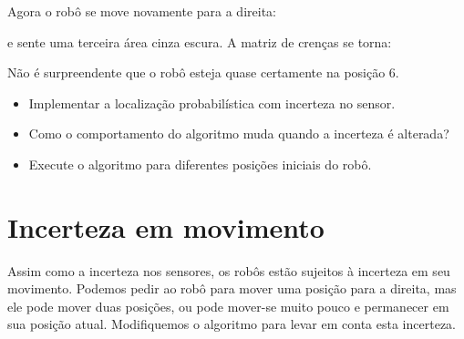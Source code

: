 Agora o robô se move novamente para a direita:
\begin{center}
\end{center}
\noindent{}e sente uma terceira área cinza escura. A matriz de crenças se torna:
\begin{center}
\end{center}
Não é surpreendente que o robô esteja quase certamente na posição 6.
\begin{framed}
\begin{itemize}
\item Implementar a localização probabilística com incerteza no sensor.
\item Como o comportamento do algoritmo muda quando a incerteza é alterada?
\item Execute o algoritmo para diferentes posições iniciais do robô.
\end{itemize}
\end{framed}

\section{Incerteza em movimento}\label{s.uncertain-motion}

Assim como a incerteza nos sensores, os robôs estão sujeitos à incerteza em seu movimento. Podemos pedir ao robô para mover uma posição para a direita, mas ele pode mover duas posições, ou pode mover-se muito pouco e permanecer em sua posição atual. Modifiquemos o algoritmo para levar em conta esta incerteza.


